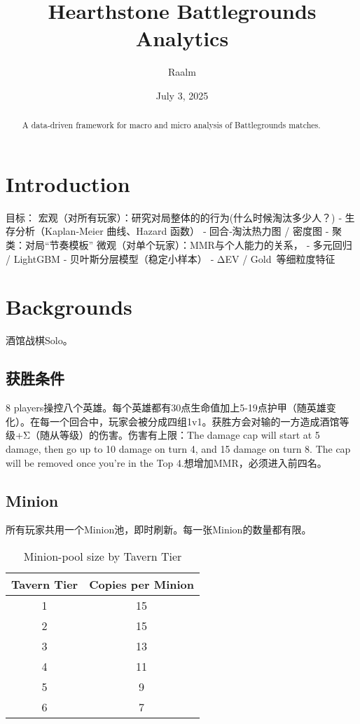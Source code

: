\documentclass[UTF8]{ctexart}
\title{Hearthstone Battlegrounds Analytics}
\author{Raalm}
\date{July 3, 2025}
\begin{document}
\maketitle

\begin{abstract}
A data‐driven framework for macro and micro analysis of Battlegrounds matches.
\end{abstract}

\section{Introduction}
目标：
宏观（对所有玩家）：研究对局整体的的行为(什么时候淘汰多少人？)
    ‑ 生存分析（Kaplan‑Meier 曲线、Hazard 函数）
‑ 回合‑淘汰热力图 / 密度图
‑ 聚类：对局“节奏模板”
微观（对单个玩家）：MMR与个人能力的关系，
‑ 多元回归 / LightGBM
‑ 贝叶斯分层模型（稳定小样本）
‑ ΔEV / Gold 等细粒度特征

\section{Backgrounds}
酒馆战棋Solo。

\subsection{获胜条件}
8 players操控八个英雄。每个英雄都有30点生命值加上5-19点护甲（随英雄变化）。在每一个回合中，玩家会被分成四组1v1。获胜方会对输的一方造成酒馆等级+Σ（随从等级）的伤害。伤害有上限：The damage cap will start at 5 damage, then go up to 10 damage on turn 4, and 15 damage on turn 8. The cap will be removed once you’re in the Top 4.想增加MMR，必须进入前四名。

\subsection{Minion}
所有玩家共用一个Minion池，即时刷新。每一张Minion的数量都有限。
\begin{table}[ht]
  \centering
  \caption{Minion-pool size by Tavern Tier}
  \label{tab:tier_pool_size}
  \begin{tabular}{cc}
    \toprule
    Tavern Tier & Copies per Minion \\
    \midrule
     1 & 15 \\
     2 & 15 \\
     3 & 13 \\
     4 & 11 \\
     5 &  9 \\
     6 &  7 \\
    \bottomrule
  \end{tabular}
\end{table}
\end{document}
